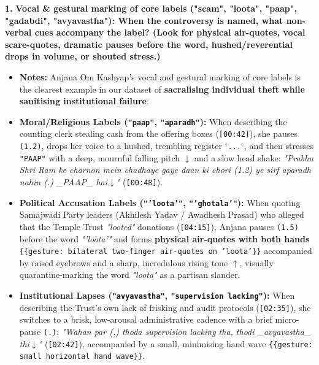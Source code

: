 \documentclass[10pt,a4paper]{article}
\begin{document}
\noindent\textbf{1.} \textbf{Vocal \& gestural marking of core labels ("scam", "loota", "paap", "gadabdi", "avyavastha"): When the controversy is named, what non-verbal cues accompany the label? (Look for physical air-quotes, vocal scare-quotes, dramatic pauses before the word, hushed/reverential drops in volume, or shouted stress.)}\par\smallskip
\begin{itemize}
  \item \textbf{Notes:}
Anjana Om Kashyap's vocal and gestural marking of core labels is the clearest example in our dataset of \textbf{sacralising individual theft while sanitising institutional failure}:\par\smallskip
  \item \textbf{Moral/Religious Labels (\texttt{"paap"}, \texttt{"aparadh"}):} When describing the counting clerk stealing cash from the offering boxes (\texttt{[00:42]}), she pauses \texttt{(1.2)}, drops her voice to a hushed, trembling register \texttt{$^\circ$...$^\circ$}, and then stresses \texttt{"PAAP"} with a deep, mournful falling pitch \texttt{$\downarrow$} and a slow head shake: \textit{"Prabhu Shri Ram ke charnon mein chadhaye gaye daan ki chori (1.2) ye sirf aparadh nahin (.) \_PAAP\_ hai$\downarrow$"} (\texttt{[00:48]}).
  \item \textbf{Political Accusation Labels (\texttt{"'loota'"}, \texttt{"'ghotala'"}):} When quoting Samajwadi Party leaders (Akhilesh Yadav / Awadhesh Prasad) who alleged that the Temple Trust \textit{"looted"} donations (\texttt{[04:15]}), Anjana pauses \texttt{(1.5)} before the word \textit{"'loota'"} and forms \textbf{physical air-quotes with both hands} \texttt{\{\{gesture: bilateral two-finger air-quotes on 'loota'\}\}} accompanied by raised eyebrows and a sharp, incredulous rising tone \texttt{$\uparrow$}, visually quarantine-marking the word \textit{"loota"} as a partisan slander.
  \item \textbf{Institutional Lapses (\texttt{"avyavastha"}, \texttt{"supervision lacking"}):} When describing the Trust's own lack of frisking and audit protocols (\texttt{[02:35]}), she switches to a brisk, low-arousal administrative cadence with a brief micro-pause \texttt{(.)}: \textit{"Wahan par (.) thoda supervision lacking tha, thodi \_avyavastha\_ thi$\downarrow$"} (\texttt{[02:42]}), accompanied by a small, minimising hand wave \texttt{\{\{gesture: small horizontal hand wave\}\}}.
\end{itemize}
\end{document}
